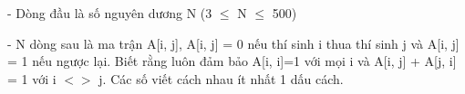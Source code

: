 - Dòng đầu là số nguyên dương N (3  $\le$  N  $\le$  500)   


   - N dòng sau là ma trận A[i, j], A[i, j] = 0 nếu thí sinh i thua thí sinh j và A[i, j] = 1 nếu ngược lại. Biết rằng luôn đảm bảo A[i, i]=1 với mọi i và A[i, j] + A[j, i] = 1 với i $<$$>$ j. Các số viết cách nhau ít nhất 1 dấu cách.